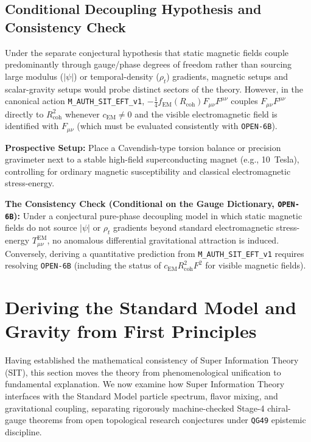 \subsection{Conditional Decoupling Hypothesis and Consistency Check}

Under the separate conjectural hypothesis that static magnetic fields couple predominantly through gauge/phase degrees of freedom rather than sourcing large modulus ($|\psi|$) or temporal-density ($\rho_t$) gradients, magnetic setups and scalar-gravity setups would probe distinct sectors of the theory. However, in the canonical action \texttt{M\_AUTH\_SIT\_EFT\_v1}, $-\frac{1}{4}f_{\mathrm{EM}}(R_{\mathrm{coh}})F_{\mu\nu}F^{\mu\nu}$ couples $F_{\mu\nu}F^{\mu\nu}$ directly to $R_{\mathrm{coh}}^2$ whenever $c_{\mathrm{EM}} \ne 0$ and the visible electromagnetic field is identified with $F_{\mu\nu}$ (which must be evaluated consistently with \texttt{OPEN-6B}).

\textbf{Prospective Setup:} Place a Cavendish-type torsion balance or precision gravimeter next to a stable high-field superconducting magnet (e.g., 10~Tesla), controlling for ordinary magnetic susceptibility and classical electromagnetic stress-energy.

\textbf{The Consistency Check (Conditional on the Gauge Dictionary, \texttt{OPEN-6B}):} Under a conjectural pure-phase decoupling model in which static magnetic fields do not source $|\psi|$ or $\rho_t$ gradients beyond standard electromagnetic stress-energy $T_{\mu\nu}^{\mathrm{EM}}$, no anomalous differential gravitational attraction is induced. Conversely, deriving a quantitative prediction from \texttt{M\_AUTH\_SIT\_EFT\_v1} requires resolving \texttt{OPEN-6B} (including the status of $c_{\mathrm{EM}} R_{\mathrm{coh}}^2 F^2$ for visible magnetic fields).


\section{Deriving the Standard Model and Gravity from First Principles}
\label{sec:emergence_sm_g_moved}
\label{sec:vortical_defects}

Having established the mathematical consistency of Super Information Theory (SIT), this section moves the theory from phenomenological unification to fundamental explanation.
We now examine how Super Information Theory interfaces with the Standard Model particle spectrum, flavor mixing, and gravitational coupling, separating rigorously machine-checked Stage-4 chiral-gauge theorems from open topological research conjectures under \texttt{QG49} epistemic discipline.

